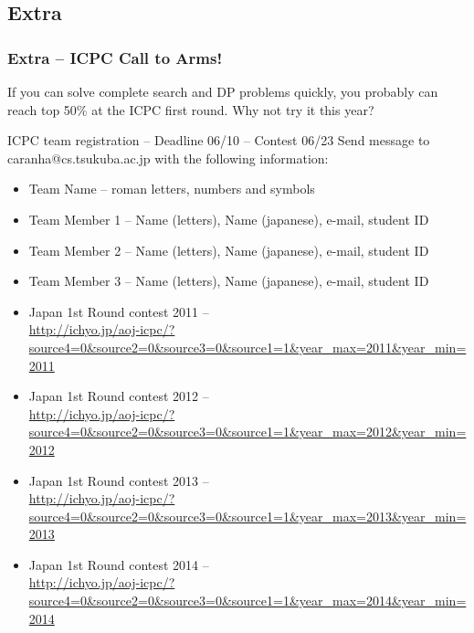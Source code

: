\documentclass{beamer}
\begin{document}
\subsection{Extra}
\begin{frame}
  \frametitle{Extra -- ICPC Call to Arms!}

  {\smaller
  If you can solve complete search and DP problems quickly, \alert{you
  probably can reach top 50\%} at the ICPC first round. Why not try it this year?
  
  \begin{block}{ICPC team registration -- Deadline 06/10 -- Contest 06/23}
    Send message to caranha@cs.tsukuba.ac.jp with the following information:
    \begin{itemize}
    \item Team Name -- roman letters, numbers and symbols
    \item Team Member 1 -- Name (letters), Name (japanese), e-mail, student ID
    \item Team Member 2 -- Name (letters), Name (japanese), e-mail, student ID
    \item Team Member 3 -- Name (letters), Name (japanese), e-mail, student ID
    \end{itemize}
  \end{block}}


  {\tiny
  \begin{itemize}
  \item Japan 1st Round contest 2011 --\\
    \url{http://ichyo.jp/aoj-icpc/?source4=0&source2=0&source3=0&source1=1&year_max=2011&year_min=2011}
  \item Japan 1st Round contest 2012 --\\
    \url{http://ichyo.jp/aoj-icpc/?source4=0&source2=0&source3=0&source1=1&year_max=2012&year_min=2012}
  \item Japan 1st Round contest 2013 --\\
    \url{http://ichyo.jp/aoj-icpc/?source4=0&source2=0&source3=0&source1=1&year_max=2013&year_min=2013}
  \item Japan 1st Round contest 2014 --\\
    \url{http://ichyo.jp/aoj-icpc/?source4=0&source2=0&source3=0&source1=1&year_max=2014&year_min=2014}
  \end{itemize}}
\end{frame}
\end{document}
